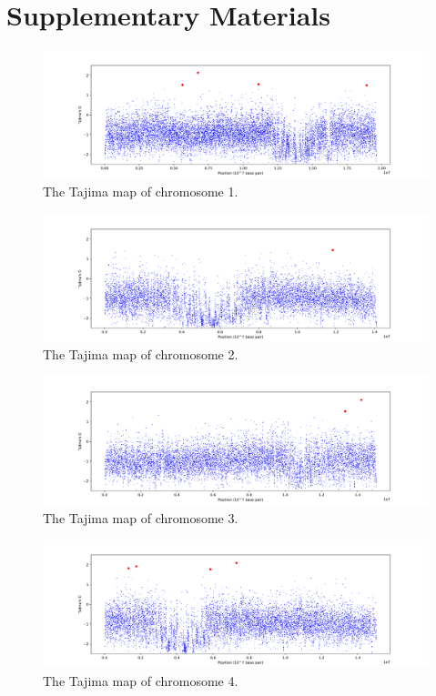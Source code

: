 \appendix
\section{Supplementary Materials}
\begin{figure}[h!]
    \centering
    \includegraphics[scale=0.4]{figs/Appx1.png}
    \caption{The Tajima map of chromosome 1.}
    \label{fig:6}
\end{figure}

\begin{figure}[h!]
    \centering
    \includegraphics[scale=0.4]{figs/Appx2.png}
    \caption{The Tajima map of chromosome 2.}
    \label{fig:7}
\end{figure}

\begin{figure}[h!]
    \centering
    \includegraphics[scale=0.4]{figs/Appx3.png}
    \caption{The Tajima map of chromosome 3.}
    \label{fig:8}
\end{figure}

\begin{figure}[h!]
    \centering
    \includegraphics[scale=0.4]{figs/Appx4.png}
    \caption{The Tajima map of chromosome 4.}
    \label{fig:9}
\end{figure}

